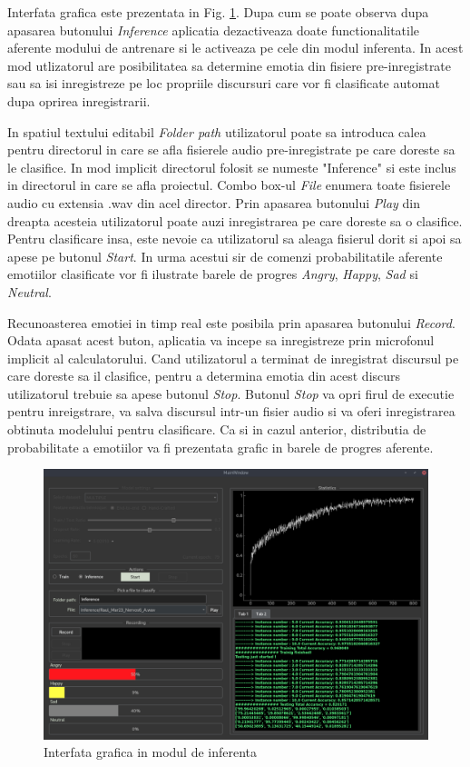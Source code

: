 \documentclass[a4paper,12pt]{book}
\begin{document}
		Interfata grafica este prezentata in Fig. \ref{fig:gui_inf}. Dupa cum se poate observa dupa apasarea butonului \textit{Inference}
		aplicatia dezactiveaza doate functionalitatile aferente modului de antrenare si le activeaza pe cele din modul inferenta. In acest mod utlizatorul are posibilitatea sa determine emotia din fisiere pre-inregistrate sau sa isi inregistreze pe loc propriile discursuri care vor fi clasificate automat dupa oprirea inregistrarii. \par
		
		In spatiul textului editabil \textit{Folder path} utilizatorul poate sa introduca calea pentru directorul in care se afla fisierele audio pre-inregistrate pe care doreste sa le clasifice. In mod implicit directorul folosit se numeste "Inference" si este inclus in directorul in care se afla proiectul. Combo box-ul \textit{File} enumera toate fisierele audio cu extensia .wav din acel director. Prin apasarea butonului \textit{Play} din dreapta acesteia utilizatorul poate auzi inregistrarea pe care doreste sa o clasifice. Pentru clasificare insa, este nevoie ca utilizatorul sa aleaga fisierul dorit si apoi sa apese pe butonul \textit{Start}. In urma acestui sir de comenzi probabilitatile aferente emotiilor clasificate vor fi ilustrate barele de progres \textit{Angry},  \textit{Happy}, \textit{Sad} si \textit{Neutral}. \par
		Recunoasterea emotiei in timp real este posibila prin apasarea butonului \textit{Record}. Odata apasat acest buton, aplicatia va incepe sa inregistreze prin microfonul implicit al calculatorului. Cand utilizatorul a terminat de inregistrat discursul pe care doreste sa il clasifice, pentru a determina emotia din acest discurs utilizatorul trebuie sa apese butonul \textit{Stop}. Butonul \textit{Stop} va opri firul de executie pentru inreigstrare, va salva discursul intr-un fisier audio si va oferi inregistrarea obtinuta modelului pentru clasificare. Ca si in cazul anterior, distributia de probabilitate a emotiilor va fi prezentata grafic in barele de progres aferente. \par
		\begin{figure}[h]
			\hspace{-0.7cm}
			\includegraphics[scale=0.40]{gui_inf}
			\caption{Interfata grafica in modul de inferenta}
			\label{fig:gui_inf}
		\end{figure} 
\end{document}
